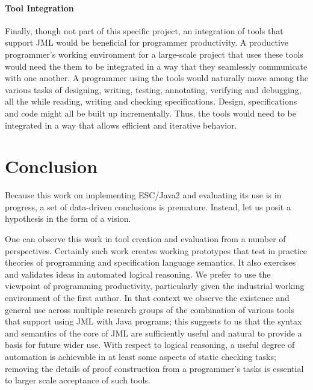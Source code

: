 \documentclass{llncs}
\begin{document}
\paragraph*{Tool Integration} Finally, though not part of this specific
project, an integration of tools that support JML would be beneficial
for programmer productivity.  A productive programmer's working
environment for a large-scale project that uses these tools would need
the them to be integrated in a way that they seamlessly communicate
with one another.  A programmer using the tools would naturally move
among the various tasks of designing, writing, testing, annotating,
verifying and debugging, all the while reading, writing and checking
specifications.  Design, specifications and code might all be built up
incrementally.  Thus, the tools would need to be integrated in a way
that allows efficient and iterative behavior.

\section{Conclusion}


Because this work on implementing ESC/Java2 and evaluating its use is
in progress, a set of data-driven conclusions is premature.  Instead,
let us posit a hypothesis in the form of a vision.

One can observe this work in tool creation and evaluation from a
number of perspectives.  Certainly such work creates working
prototypes that test in practice theories of programming and
specification language semantics.  It also exercises and validates
ideas in automated logical reasoning.  We prefer to use the viewpoint
of programming productivity, particularly given the industrial working
environment of the first author.  In that context we observe the
existence and general use across multiple research groups of the
combination of various tools that support using JML with Java
programs; this suggests to us that the syntax and semantics of the
core of JML are sufficiently useful and natural to provide a basis for
future wider use.  With respect to logical reasoning, a useful degree
of automation is achievable in at least some aspects of static
checking tasks; removing the details of proof construction from a
programmer's tasks is essential to larger scale acceptance of such
tools.
\end{document}
